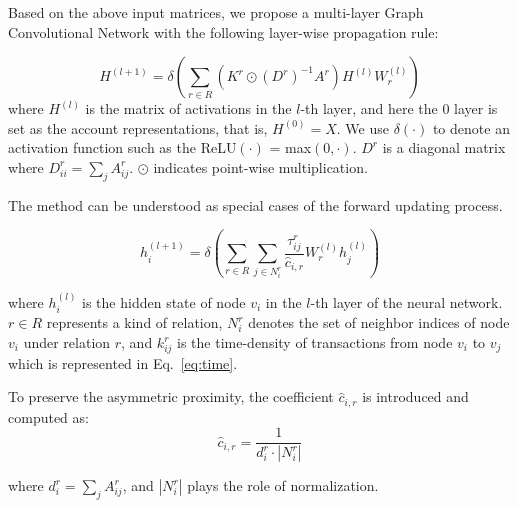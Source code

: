 Based on the above input matrices, we propose a multi-layer Graph Convolutional Network with the following layer-wise propagation rule:

\begin{equation}
H^{(l+1)}=\delta(\sum_{r\in R} (K^r\odot (D^r)^{-1}A^r)H^{(l)}W_r^{(l)})
\end{equation}
\noindent where $H^{(l)}$ is the matrix of activations in the $l$-th layer, and here the $0$ layer is set as the account representations, that is, $H^{(0)}=X$. We use $\delta(\cdot)$ to denote an activation function such as the ReLU$(\cdot)$ = max$(0,\cdot)$. $D^r$ is a diagonal matrix where $D^r_{ii}=\sum_{j}A^r_{ij}$. $\odot$ indicates point-wise multiplication.


The method can be understood as special cases of the forward updating process.

\begin{equation}
h_i^{(l+1)}=\delta(\sum_{r\in R} \sum_{j \in N_i^r} \frac{\tau_{ij}^r}{\hat c_{i,r}}W_r^{(l)}h_j^{(l)})
\end{equation}

\noindent where $h_i^{(l)}$ is the hidden state of node $v_i$ in the $l$-th layer of the neural network. $r \in R$ represents a kind of relation, $N_i^r$ denotes the set of neighbor indices of node $v_i$ under relation $r$, and $k_{ij}^r$ is the time-density of transactions from node $v_i$ to $v_j$ which is represented in Eq.~\ref{eq:time}. 

To preserve the asymmetric proximity, the coefficient $\hat c_{i,r}$ is introduced and computed as:
\begin{equation}
\hat c_{i,r}=\frac{1}{d_i^r\cdot |N_i^r|}
\end{equation}

\noindent where $d_i^r=\sum_{j}A^r_{ij}$, and $|N_i^r|$ plays the role of normalization.




